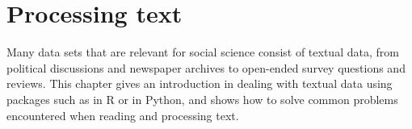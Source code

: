 \chapter{Processing text}
\label{chap:protext}

Many data sets that are relevant for social science consist of textual data, from political discussions and newspaper archives to open-ended survey questions and reviews. This chapter gives an introduction in dealing with textual data using packages such as  in R or  in Python, and shows how to solve common problems encountered when reading and processing text. 







